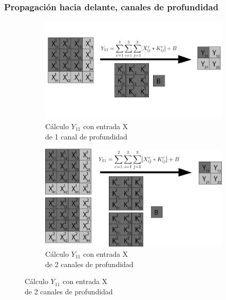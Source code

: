 \subsubsection{Propagación hacia delante, canales de profundidad}

\begin{figure}[H]
	\centering
	\begin{subfigure}{.5\textwidth}
		\hspace{-10mm}
		\includegraphics[width=1.2\linewidth]{imagenes/conv_1_1canal.jpg}  
		\caption{Cálculo $Y_{11}$ con entrada X \\ de 1 canal de profundidad}
	\end{subfigure}%
	\begin{subfigure}{.5\textwidth}
		\hspace{10mm}
		\includegraphics[width=1.2\linewidth]{imagenes/conv_1_2canales.jpg}  
		\caption{Cálculo $Y_{11}$ con entrada X \\ de 2 canales de profundidad}
	\end{subfigure}
	

\end{figure}

